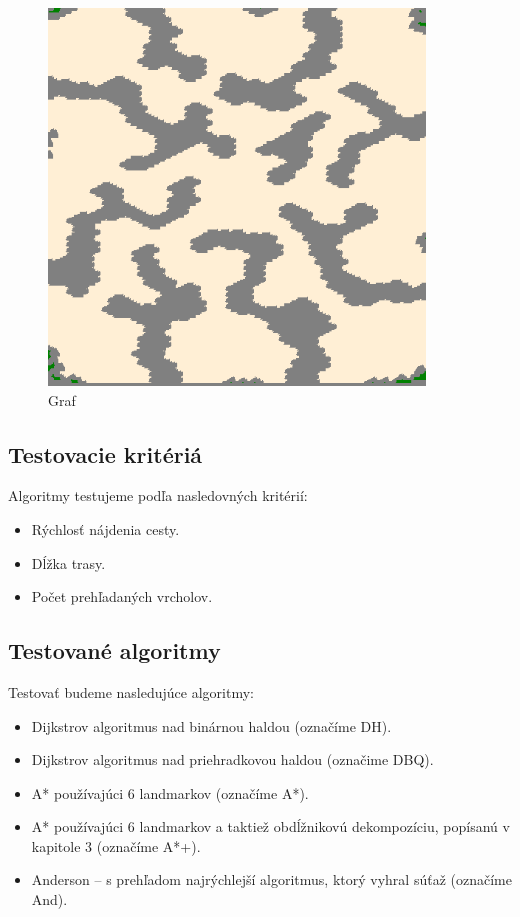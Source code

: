 \begin{figure}[h]
\centering
\includegraphics[width=10cm]{./img/BigGameHunters.png}
\caption{Graf }
\label{fig:biggamehunters_map}
\end{figure}

\subsection{Testovacie kritériá}
Algoritmy testujeme podľa nasledovných kritérií:

\begin{itemize}
\item Rýchlosť nájdenia cesty.
\item Dĺžka trasy.
\item Počet prehľadaných vrcholov.
\end{itemize}


\subsection{Testované algoritmy}
Testovať budeme nasledujúce algoritmy:
\begin{itemize}
\item Dijkstrov algoritmus nad binárnou haldou (označíme DH).
\item Dijkstrov algoritmus nad priehradkovou haldou (označime DBQ).
\item A* používajúci 6 landmarkov (označíme A*).
\item A* používajúci 6 landmarkov a taktiež obdĺžnikovú dekompozíciu, popísanú v kapitole 3 (označíme A*+).
\item Anderson -- s prehľadom najrýchlejší algoritmus, ktorý vyhral súťaž (označíme And).
\end{itemize}


